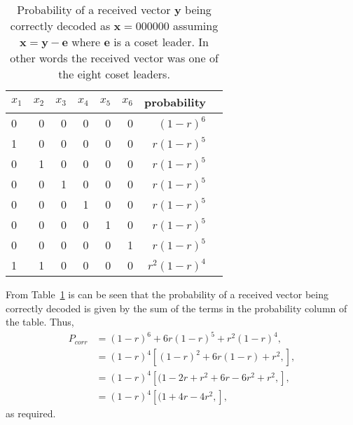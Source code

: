 \begin{table}[!h]\centering
\begin{tabular}{lrrrrr|rr}\toprule
$x_1$ &$x_2$ &$x_3$ &$x_4$ &$x_5$ &$x_6$ &probability \\\midrule
0 &0 &0 &0 &0 &0 &$(1-r)^6$ \\
1 &0 &0 &0 &0 &0 &$r(1-r)^5$ \\
0 &1 &0 &0 &0 &0 &$r(1-r)^5$ \\
0 &0 &1 &0 &0 &0 &$r(1-r)^5$ \\
0 &0 &0 &1 &0 &0 &$r(1-r)^5$ \\
0 &0 &0 &0 &1 &0 &$r(1-r)^5$ \\
0 &0 &0 &0 &0 &1 &$r(1-r)^5$ \\
1 &1 &0 &0 &0 &0 &$r^2(1-r)^4$ \\
\bottomrule
\end{tabular}
\caption{Probability of a received vector $\bm{y}$ being correctly decoded as $\bm{x}=000000$ assuming $\bm{x} = \bm{y} - \bm{e}$ where $\bm{e}$ is a coset leader. In other words the received vector was one of the eight coset leaders.}
\label{tab:12}
\end{table}

From Table~\ref{tab:12} is can be seen that the probability of a received vector being correctly decoded is given by the sum of the terms in the probability column of the table. Thus,
\begin{align*}
	P_{corr} &=(1-r)^6 + 6r(1-r)^5 + r^2(1-r)^4,\\
	&=(1-r)^4\left[(1-r)^2 + 6r(1-r) + r^2,\right],\\
	&=(1-r)^4\left[(1-2r + r^2 + 6r-6r^2 + r^2,\right],\\
	&=(1-r)^4\left[(1+ 4r - 4r^2,\right],
\end{align*}
as required.

